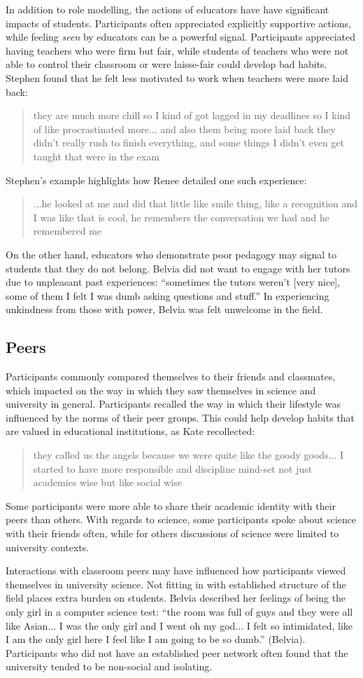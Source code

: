 In addition to role modelling, the actions of educators have have significant impacts of students. Participants often appreciated explicitly supportive actions, while feeling \textit{seen} by educators can be a powerful signal. Participants appreciated having teachers who were firm but fair, while students of teachers who were not able to control their classroom or were laisse-fair could develop bad habits. Stephen found that he felt less motivated to work when teachers were more laid back: \blockquote{they are much more chill so I kind of got lagged in my deadlines so I kind of like procrastinated more... and also them being more laid back they didn't really rush to finish everything, and some things I didn't even get taught that were in the exam}. Stephen's example highlights how  Renee detailed one such experience: \blockquote{...he looked at me and did that little like smile thing, like a recognition and I was like that is cool, he remembers the conversation we had and he remembered me} On the other hand, educators who demonstrate poor pedagogy may signal to students that they do not belong. Belvia did not want to engage with her tutors due to unpleasant past experiences: ``sometimes the tutors weren't [very nice], some of them I felt I was dumb asking questions and stuff.'' In experiencing unkindness from those with power, Belvia was felt unwelcome in the field. 



\subsection{Peers}
Participants commonly compared themselves to their friends and classmates, which impacted on the way in which they saw themselves in science and university in general. Participants recalled the way in which their lifestyle was influenced by the norms of their peer groups. This could help develop habits that are valued in educational institutions, as Kate recollected: \blockquote{they called us the angels because we were quite like the goody goods... I started to have more responsible and discipline mind-set not just academics wise but like social wise}. Some participants were more able to share their academic identity with their peers than others. With regards to science, some participants spoke about science with their friends often, while for others discussions of science were limited to university contexts.


Interactions with classroom peers may have influenced how participants viewed themselves in university science. Not fitting in with established structure of the field places extra burden on students. Belvia described her feelings of being the only girl in a computer science test: ``the room was full of guys and they were all like Asian... I was the only girl and I went oh my god... I felt so intimidated, like I am the only girl here I feel like I am going to be so dumb.'' (Belvia). Participants who did not have an established peer network often found that the university tended to be non-social and isolating.

